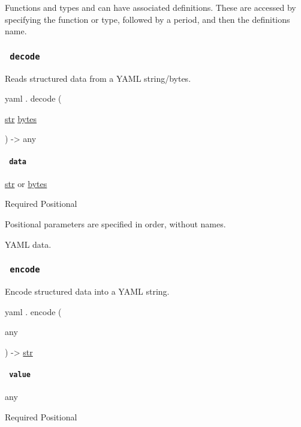 \label{definitions-tooltip}
Functions and types and can have associated definitions. These are
accessed by specifying the function or type, followed by a period, and
then the definition\textquotesingle s name.

\subsubsection{\texorpdfstring{\texttt{\ decode\ }}{ decode }}\label{definitions-decode}

Reads structured data from a YAML string/bytes.

yaml { . } { decode } (

{ \href{/docs/reference/foundations/str/}{str}
\href{/docs/reference/foundations/bytes/}{bytes} }

) -\textgreater{} { any }

\paragraph{\texorpdfstring{\texttt{\ data\ }}{ data }}\label{definitions-decode-data}

\href{/docs/reference/foundations/str/}{str} {or}
\href{/docs/reference/foundations/bytes/}{bytes}

{Required} {{ Positional }}

\label{definitions-decode-data-positional-tooltip}
Positional parameters are specified in order, without names.

YAML data.

\subsubsection{\texorpdfstring{\texttt{\ encode\ }}{ encode }}\label{definitions-encode}

Encode structured data into a YAML string.

yaml { . } { encode } (

{ { any } }

) -\textgreater{} \href{/docs/reference/foundations/str/}{str}

\paragraph{\texorpdfstring{\texttt{\ value\ }}{ value }}\label{definitions-encode-value}

{ any }

{Required} {{ Positional }}

